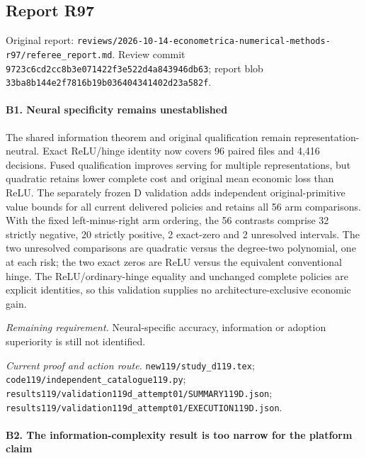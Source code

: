 \subsection{Report R97}

Original report: \nolinkurl{reviews/2026-10-14-econometrica-numerical-methods-r97/referee_report.md}. Review commit \nolinkurl{9723c6cd2cc8b3e071422f3e522d4a843946db63}; report blob \nolinkurl{33ba8b144e2f7816b19b036404341402d23a582f}.

\paragraph{B1. Neural specificity remains unestablished}

The shared information theorem and original qualification remain representation-neutral. Exact ReLU/\allowbreak{}hinge identity now covers 96 paired files and 4,416 decisions. Fused qualification improves serving for multiple representations, but quadratic retains lower complete cost and original mean economic loss than ReLU. The separately frozen D validation adds independent original-primitive value bounds for all current delivered policies and retains all 56 arm comparisons. With the fixed left-minus-right arm ordering, the 56 contrasts comprise 32 strictly negative, 20 strictly positive, 2 exact-zero and 2 unresolved intervals. The two unresolved comparisons are quadratic versus the degree-two polynomial, one at each risk; the two exact zeros are ReLU versus the equivalent conventional hinge. The ReLU/\allowbreak{}ordinary-hinge equality and unchanged complete policies are explicit identities, so this validation supplies no architecture-exclusive economic gain.

\par\emph{Remaining requirement.} Neural-specific accuracy, information or adoption superiority is still not identified.

\par\emph{Current proof and action route.} \nolinkurl{new119/study_d119.tex}; \nolinkurl{code119/independent_catalogue119.py}; \nolinkurl{results119/validation119d_attempt01/SUMMARY119D.json}; \nolinkurl{results119/validation119d_attempt01/EXECUTION119D.json}.

\paragraph{B2. The information-complexity result is too narrow for the platform claim}

